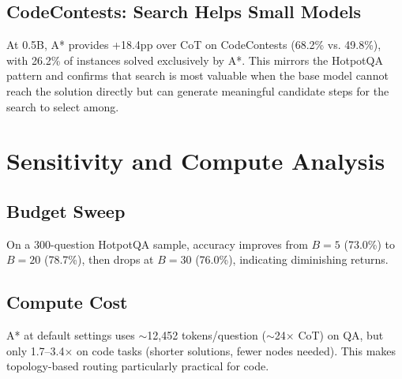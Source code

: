 \subsection{CodeContests: Search Helps Small Models}

At 0.5B, A* provides +18.4pp over CoT on CodeContests (68.2\% vs. 49.8\%), with 26.2\% of instances solved exclusively by A*. This mirrors the HotpotQA pattern and confirms that search is most valuable when the base model cannot reach the solution directly but can generate meaningful candidate steps for the search to select among.

\FloatBarrier
\section{Sensitivity and Compute Analysis}

\subsection{Budget Sweep}

On a 300-question HotpotQA sample, accuracy improves from $B=5$ (73.0\%) to $B=20$ (78.7\%), then drops at $B=30$ (76.0\%), indicating diminishing returns.

\subsection{Compute Cost}

A* at default settings uses $\sim$12,452 tokens/question ($\sim$24$\times$ CoT) on QA, but only 1.7--3.4$\times$ on code tasks (shorter solutions, fewer nodes needed). This makes topology-based routing particularly practical for code.

